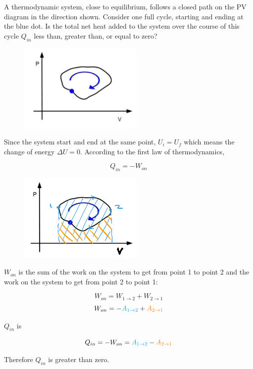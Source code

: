 \begin{texample}
	A thermodynamic system, close to equilibrium, follows a closed path on the PV diagram in the direction shown. Consider one full cycle, starting and ending at the blue dot. Is the total net heat added to the system over the course of this cycle \(Q_{in}\) less than, greater than, or equal to zero?
	
	\begin{figure}[H]
		\centering
		\includegraphics[width=60mm]{25.png}
	\end{figure}
	
	Since the system start and end at the same point, \(U_i=U_f\) which means the change of energy \(\Delta U=0\). According to the first law of thermodynamics,
	
	\[ Q_{in}=-W_{on} \]
	
	\begin{figure}[H]
		\centering
		\includegraphics[width=60mm]{26.png}
	\end{figure}
	
	\(W_{on}\) is the sum of the work on the system to get from point 1 to point 2 and the work on the system to get from point 2 to point 1:
	
	\[W_{on}=W_{1\to2}+W_{2\to1}\]
	\[W_{on}=-\textcolor{cyan}{A_{1\to2}}+\textcolor{orange}{A_{2\to1}}\]
	
	$Q_{in}$ is
	
	\[ Q_{in}=-W_{on}=\textcolor{cyan}{A_{1\to2}}-\textcolor{orange}{A_{2\to1}} \]
	
	Therefore \(Q_{in}\) is greater than zero.
\end{texample}

